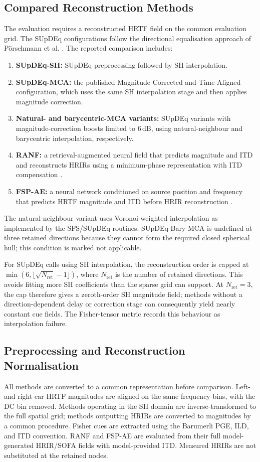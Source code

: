 \documentclass[journal]{IEEEtran}
\begin{document}
\subsection{Compared Reconstruction Methods}
The evaluation requires a reconstructed HRTF field on the common evaluation grid. The SUpDEq configurations follow the directional equalisation approach of P\"orschmann et al. \cite{Poerschmann2019SUpDEq}. The reported comparison includes:
\begin{enumerate}
    \item \textbf{SUpDEq-SH:} SUpDEq preprocessing followed by SH interpolation.
    \item \textbf{SUpDEq-MCA:} the published Magnitude-Corrected and Time-Aligned configuration, which uses the same SH interpolation stage and then applies magnitude correction.
    \item \textbf{Natural- and barycentric-MCA variants:} SUpDEq variants with magnitude-correction boosts limited to \(6\,\mathrm{dB}\), using natural-neighbour and barycentric interpolation, respectively.
    \item \textbf{RANF:} a retrieval-augmented neural field that predicts magnitude and ITD and reconstructs HRIRs using a minimum-phase representation with ITD compensation \cite{Masuyama2025RANF,Masuyama2025ICASSPRANF}.
    \item \textbf{FSP-AE:} a neural network conditioned on source position and frequency that predicts HRTF magnitude and ITD before HRIR reconstruction \cite{Ito2025FSPAE}.
\end{enumerate}
The natural-neighbour variant uses Voronoi-weighted interpolation as implemented by the SFS/SUpDEq routines. SUpDEq-Bary-MCA is undefined at three retained directions because they cannot form the required closed spherical hull; this condition is marked not applicable.

For SUpDEq calls using SH interpolation, the reconstruction order is capped at \(\min(6,\lfloor\sqrt{N_{\mathrm{ret}}}-1\rfloor)\), where \(N_{\mathrm{ret}}\) is the number of retained directions. This avoids fitting more SH coefficients than the sparse grid can support. At \(N_{\mathrm{ret}}=3\), the cap therefore gives a zeroth-order SH magnitude field; methods without a direction-dependent delay or correction stage can consequently yield nearly constant cue fields. The Fisher-tensor metric records this behaviour as interpolation failure.

\subsection{Preprocessing and Reconstruction Normalisation}
All methods are converted to a common representation before comparison. Left- and right-ear HRTF magnitudes are aligned on the same frequency bins, with the DC bin removed. Methods operating in the SH domain are inverse-transformed to the full spatial grid; methods outputting HRIRs are converted to magnitudes by a common procedure. Fisher cues are extracted using the Barumerli PGE, ILD, and  ITD convention. RANF and FSP-AE are evaluated from their full model-generated HRIR/SOFA fields with model-provided ITD. Measured HRIRs are not substituted at the retained nodes.
\end{document}
